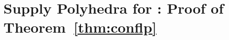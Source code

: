 \def\Supp{\mathsf{Supp}\xspace}
\newcommand{\barcalS}{\bar{\cal S}\xspace}
\renewcommand{\brp}{{(p)}}
\renewcommand{\br}[1]{{(#1)}}
\renewcommand{\brp}{{(p)}}
\renewcommand{\br}[1]{{(#1)}}
\renewcommand{\bc}{{\bar c}}
\newcommand{\brt}{{(t)}}
\def\cc{\tilde{c}}
\newcommand{\barD}{\bar{D}}
\def\calFr{\calF^{(\alpha,\beta)}}
\section{Supply Polyhedra for \cckp: Proof of Theorem~\ref{thm:conflp}}\label{sec:conflp}
%
